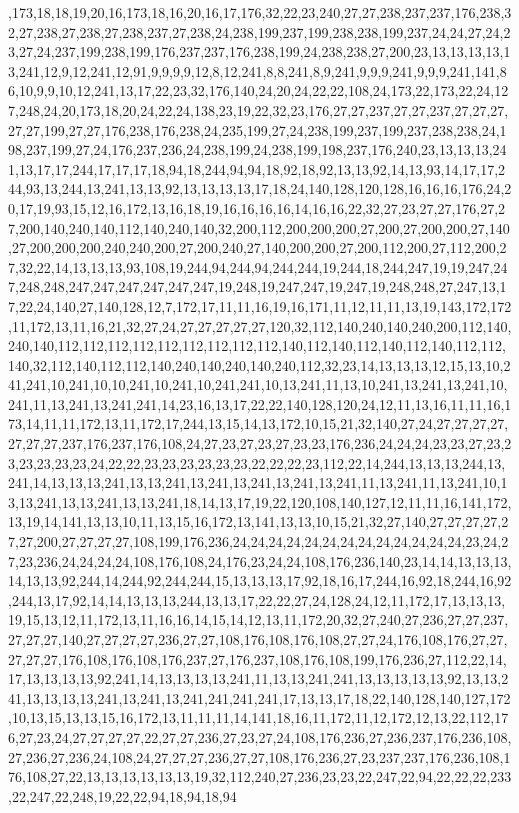 ,173,18,18,19,20,16,173,18,16,20,16,17,176,32,22,23,240,27,27,238,237,237,176,238,32,27,238,27,238,27,238,237,27,238,24,238,199,237,199,238,238,199,237,24,24,27,24,23,27,24,237,199,238,199,176,237,237,176,238,199,24,238,238,27,200,23,13,13,13,13,13,241,12,9,12,241,12,91,9,9,9,9,12,8,12,241,8,8,241,8,9,241,9,9,9,241,9,9,9,241,141,86,10,9,9,10,12,241,13,17,22,23,32,176,140,24,20,24,22,22,108,24,173,22,173,22,24,127,248,24,20,173,18,20,24,22,24,138,23,19,22,32,23,176,27,27,237,27,27,237,27,27,27,27,27,199,27,27,176,238,176,238,24,235,199,27,24,238,199,237,199,237,238,238,24,198,237,199,27,24,176,237,236,24,238,199,24,238,199,198,237,176,240,23,13,13,13,241,13,17,17,244,17,17,17,18,94,18,244,94,94,18,92,18,92,13,13,92,14,13,93,14,17,17,244,93,13,244,13,241,13,13,92,13,13,13,13,17,18,24,140,128,120,128,16,16,16,176,24,20,17,19,93,15,12,16,172,13,16,18,19,16,16,16,16,14,16,16,22,32,27,23,27,27,176,27,27,200,140,240,140,112,140,240,140,32,200,112,200,200,200,27,200,27,200,200,27,140,27,200,200,200,240,240,200,27,200,240,27,140,200,200,27,200,112,200,27,112,200,27,32,22,14,13,13,13,93,108,19,244,94,244,94,244,244,19,244,18,244,247,19,19,247,247,248,248,247,247,247,247,247,247,19,248,19,247,247,19,247,19,248,248,27,247,13,17,22,24,140,27,140,128,12,7,172,17,11,11,16,19,16,171,11,12,11,11,13,19,143,172,172,11,172,13,11,16,21,32,27,24,27,27,27,27,27,120,32,112,140,240,140,240,200,112,140,240,140,112,112,112,112,112,112,112,112,112,140,112,140,112,140,112,140,112,112,140,32,112,140,112,112,140,240,140,240,140,240,112,32,23,14,13,13,13,12,15,13,10,241,241,10,241,10,10,241,10,241,10,241,241,10,13,241,11,13,10,241,13,241,13,241,10,241,11,13,241,13,241,241,14,23,16,13,17,22,22,140,128,120,24,12,11,13,16,11,11,16,173,14,11,11,172,13,11,172,17,244,13,15,14,13,172,10,15,21,32,140,27,24,27,27,27,27,27,27,27,237,176,237,176,108,24,27,23,27,23,27,23,23,176,236,24,24,24,23,23,27,23,23,23,23,23,23,24,22,22,23,23,23,23,23,23,22,22,22,23,112,22,14,244,13,13,13,244,13,241,14,13,13,13,241,13,13,241,13,241,13,241,13,241,13,241,11,13,241,11,13,241,10,13,13,241,13,13,241,13,13,241,18,14,13,17,19,22,120,108,140,127,12,11,11,16,141,172,13,19,14,141,13,13,10,11,13,15,16,172,13,141,13,13,10,15,21,32,27,140,27,27,27,27,27,27,200,27,27,27,27,108,199,176,236,24,24,24,24,24,24,24,24,24,24,24,24,24,23,24,27,23,236,24,24,24,24,108,176,108,24,176,23,24,24,108,176,236,140,23,14,14,13,13,13,14,13,13,92,244,14,244,92,244,244,15,13,13,13,17,92,18,16,17,244,16,92,18,244,16,92,244,13,17,92,14,14,13,13,13,244,13,13,17,22,22,27,24,128,24,12,11,172,17,13,13,13,19,15,13,12,11,172,13,11,16,16,14,15,14,12,13,11,172,20,32,27,240,27,236,27,27,237,27,27,27,140,27,27,27,27,236,27,27,108,176,108,176,108,27,27,24,176,108,176,27,27,27,27,27,176,108,176,108,176,237,27,176,237,108,176,108,199,176,236,27,112,22,14,17,13,13,13,13,92,241,14,13,13,13,13,241,11,13,13,241,241,13,13,13,13,13,92,13,13,241,13,13,13,13,241,13,241,13,241,241,241,241,17,13,13,17,18,22,140,128,140,127,172,10,13,15,13,13,15,16,172,13,11,11,11,14,141,18,16,11,172,11,12,172,12,13,22,112,176,27,23,24,27,27,27,27,22,27,27,236,27,23,27,24,108,176,236,27,236,237,176,236,108,27,236,27,236,24,108,24,27,27,27,236,27,27,108,176,236,27,23,237,237,176,236,108,176,108,27,22,13,13,13,13,13,13,19,32,112,240,27,236,23,23,22,247,22,94,22,22,22,233,22,247,22,248,19,22,22,94,18,94,18,94